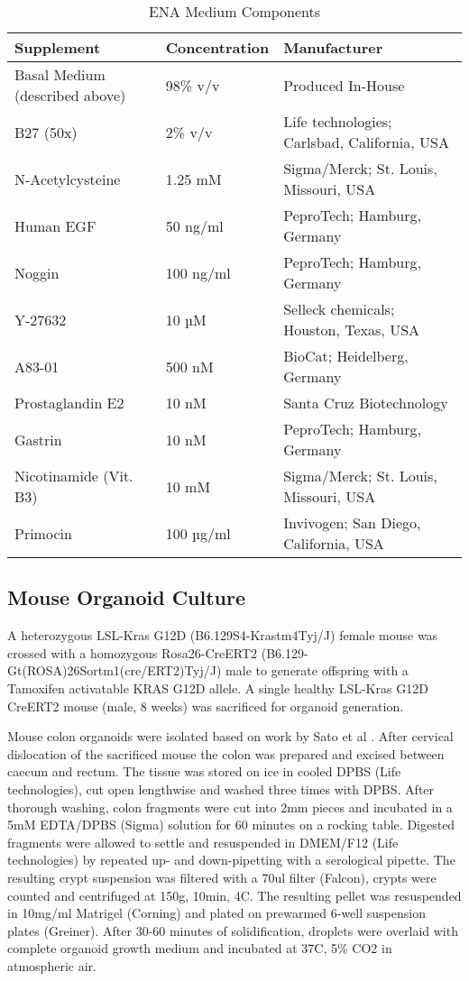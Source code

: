 \begin{flushleft}
\begin{table}[htbp]
\caption{ENA Medium Components}
\label{tab:ena_medium_supplements}
\begin{tabularx}{\textwidth}{Xll}
\toprule
\textbf{Supplement} & \textbf{Concentration} & \textbf{Manufacturer} \\
\midrule
Basal Medium (described above) & 98\% v/v & Produced In-House \\
B27 (50x) & 2\% v/v & Life technologies; Carlsbad, California, USA \\
N-Acetylcysteine & 1.25 mM & Sigma/Merck; St. Louis, Missouri, USA \\
Human EGF & 50 ng/ml & PeproTech; Hamburg, Germany \\
Noggin & 100 ng/ml & PeproTech; Hamburg, Germany \\
Y-27632 & 10 µM & Selleck chemicals; Houston, Texas, USA \\
A83-01 & 500 nM & BioCat; Heidelberg, Germany \\
Prostaglandin E2 & 10 nM & Santa Cruz Biotechnology \\
Gastrin & 10 nM & PeproTech; Hamburg, Germany \\
Nicotinamide (Vit. B3) & 10 mM & Sigma/Merck; St. Louis, Missouri, USA \\
Primocin & 100 µg/ml & Invivogen; San Diego, California, USA \\
\bottomrule
\end{tabularx}
\end{table}





\subsection{Mouse Organoid Culture}
A heterozygous LSL-Kras G12D (B6.129S4-Krastm4Tyj/J) female mouse was crossed with a homozygous Rosa26-CreERT2 (B6.129-Gt(ROSA)26Sortm1(cre/ERT2)Tyj/J) male to generate offspring with a Tamoxifen activatable KRAS G12D allele. A single healthy LSL-Kras G12D CreERT2 mouse (male, 8 weeks) was sacrificed for organoid generation. 

Mouse colon organoids were isolated based on work by Sato et al \cite{Sato2009-jw}. After cervical dislocation of the sacrificed mouse the colon was prepared and excised between caecum and rectum. The tissue was stored on ice in cooled DPBS (Life technologies), cut open lengthwise and washed three times with DPBS. After thorough washing, colon fragments were cut into 2mm pieces and incubated in a 5mM EDTA/DPBS (Sigma) solution for 60 minutes on a rocking table. Digested fragments were allowed to settle and resuspended in DMEM/F12 (Life technologies) by repeated up- and down-pipetting with a serological pipette. The resulting crypt suspension was filtered with a 70ul filter (Falcon), crypts were counted and centrifuged at 150g, 10min, 4C. The resulting pellet was resuspended in 10mg/ml Matrigel (Corning) and plated on prewarmed 6-well suspension plates (Greiner). After 30-60 minutes of solidification, droplets were overlaid with complete organoid growth medium and incubated at 37C, 5\% CO2 in atmospheric air.


\end{flushleft}
